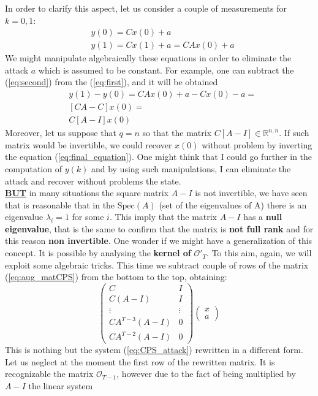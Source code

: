 \noindent
In order to clarify this aspect, let us consider a couple of measurements for $k=0,1$:
\begin{align}
	&y(0)=Cx(0)+a \label{eq:first}\\ 
	&y(1)=Cx(1)+a=CAx(0)+a \label{eq:second}
\end{align}
We might manipulate algebraically these equations in order to eliminate the attack $a$ which is assumed to be constant. For example, one can subtract the (\ref{eq:second}) from the (\ref{eq:first}), and it will be obtained
\begin{align}
	&y(1)-y(0)=CAx(0) + a-Cx(0)-a=\\
	&[CA-C]x(0) =\\
	&C[A-I]x(0) \label{eq:final_equation}
\end{align} 
Moreover, let us suppose that $q=n$ so that the matrix $C[A-I]\in\mathbb{R}^{n,n}$. If such matrix would be invertible, we could recover $x(0)$ without problem by inverting the equation (\ref{eq:final_equation}). One might think that I could go further in the computation of $y(k)$ and by using such manipulations, I can eliminate the attack and recover without problems the state.\\
\underline{\textbf{BUT}} in many situations the square matrix $A-I$ is not invertible, we have seen that is reasonable that in the $\text{Spec}(A)$ (set of the eigenvalues of A) there is an eigenvalue $\lambda_i=1$ for  some $i$.
This imply that the matrix $A-I$ has a \textbf{null eigenvalue}, that is the same to confirm that the matrix is \textbf{not full rank} and for this reason \textbf{non invertible}.
One wonder if we might have a generalization of this concept. It is possible by analysing the \textbf{kernel of} $\mathcal{O}'_T$. To this aim, again, we will exploit some algebraic tricks. This time we subtract couple of rows of the matrix (\ref{eq:aug_matCPS}) from the bottom to the top, obtaining:
\begin{equation}
	\begin{pmatrix}
		C & I \\
		C(A-I) & I \\
		\vdots & \vdots \\
		CA^{T-3} (A-I) & 0\\
		CA^{T-2} (A-I) & 0
  	\end{pmatrix} \begin{pmatrix}
  		x\\a
  	\end{pmatrix}
\end{equation}
This is nothing but the system (\ref{eq:CPS_attack}) rewritten in a different form. Let us neglect at the moment the first row of the rewritten matrix. It is recognizable the matrix $\mathcal{O}_{T-1}$, however due to the fact of being multiplied by $A-I$ the linear system 
